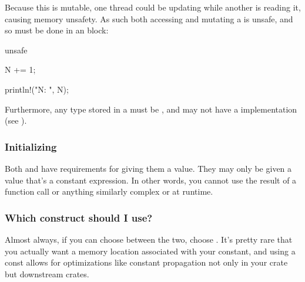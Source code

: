 Because this is mutable, one thread could be updating  while another is reading it, causing memory unsafety. As such both 
accessing and mutating a  is unsafe, and so must be done in an  block:

\begin{rustc}
unsafe {
    N += 1;

    println!("N: {}", N);
}
\end{rustc}

Furthermore, any type stored in a  must be , and may not have a  implementation (see ).

\subsubsection*{Initializing}

Both  and  have requirements for giving them a value. They may only be given a value that's a constant 
expression. In other words, you cannot use the result of a function call or anything similarly complex or at runtime.

\subsubsection*{Which construct should I use?}

Almost always, if you can choose between the two, choose . It's pretty rare that you actually want a memory location 
associated with your constant, and using a const allows for optimizations like constant propagation not only in your crate but 
downstream crates.
